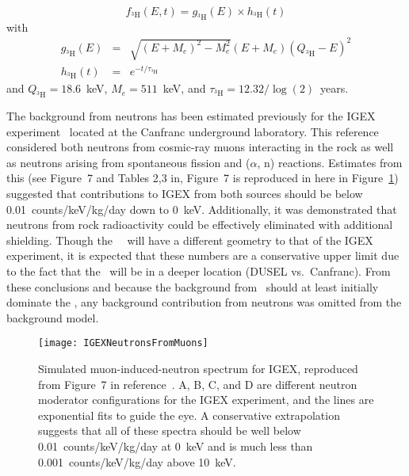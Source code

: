 		\begin{equation}
			f_{^{3}\text{H}}\left(E, t\right)  =  g_{^{3}\text{H}}\left(E\right) \times h_{^{3}\text{H}}\left(t\right) 
		\end{equation}
		with
		\begin{eqnarray}
		g_{^{3}\text{H}}\left(E\right) & = & \sqrt{(E + M_e)^2 - M_e^2} \left(
			E + M_e \right) \left( Q_{^3\text{H}} - E \right)^2 \\
h_{^{3}\text{H}}\left(t\right) & = & e^{-t/\tau_{^3\text{H}}}
		\end{eqnarray}
		and $Q_{^3\text{H}}=18.6$~keV, $M_{e}=511$~keV, and $\tau_{^3\text{H}} = 12.32 / \log(2)$~years.
		
	The background from neutrons has been estimated previously for the IGEX experiment~\cite{Carmona2004523} located at the Canfranc underground laboratory.  This reference considered both neutrons from cosmic-ray muons interacting in the rock as well as neutrons arising from spontaneous fission and ($\alpha$, n) reactions.  Estimates from this (see Figure~7 and Tables 2,3 in\cite{Carmona2004523}, Figure~7 is reproduced in here in Figure~\ref{fig:IGEXNeutrons}) suggested that contributions to IGEX from both sources should be below 0.01~counts/keV/kg/day down to 0~keV.  Additionally, it was demonstrated that neutrons from rock radioactivity could be effectively eliminated with additional shielding.  Though the \MJ~\minmod~will have a different geometry to that of the IGEX experiment, it is expected that these numbers are a conservative upper limit due to the fact that the \minmod~will be in a deeper location (DUSEL vs.~Canfranc).  From these conclusions and because the background from \hthree~should at least initially dominate the \minmod, any background contribution from neutrons was omitted from the background model.
	
			\begin{figure}
				\centering
				\texttt{[image: IGEXNeutronsFromMuons]}
				\caption[Simulated muon-induced-neutron spectrum for IGEX.]{Simulated muon-induced-neutron 
				spectrum for IGEX, reproduced from Figure~7 in reference~\cite{Carmona2004523}.  A, B, C, and D are different
				neutron moderator configurations for the IGEX experiment, and the lines are exponential fits to guide the eye.
				A conservative extrapolation suggests that all of these spectra should be well below 0.01~counts/keV/kg/day at
				0~keV and is much less than 0.001~counts/keV/kg/day above 10~keV.}
				\label{fig:IGEXNeutrons}
			\end{figure}
	

